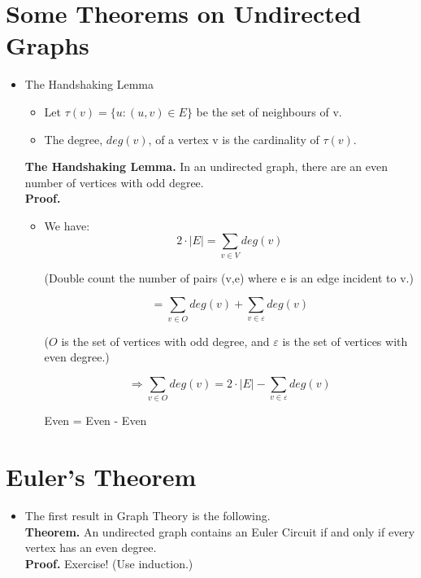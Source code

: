 \documentclass[12pt]{article}
\begin{document}
\section{Some Theorems on Undirected Graphs}
\renewcommand{\labelitemii}{$\circ$}
\renewcommand{\labelitemiii}{$\cdot$}
\renewcommand{\labelitemiii}{$\rightarrow$}
\renewcommand{\labelitemiv}{$\star$}
\begin{itemize}
\item The Handshaking Lemma	
	\begin{itemize}
	\item Let $\tau (v) = \{u: (u,v) \in E\}$ be the set of neighbours of v.
	\item The degree, $deg(v)$, of a vertex v is the cardinality of $\tau (v)$.
	\end{itemize}
\textbf{The Handshaking Lemma.} In an undirected graph, there are an even number of vertices with odd degree.\\
\textbf{Proof.} 
\begin{itemize}
\item We have: \\
	$$2 \cdot |E| = \sum_{v \in V} deg(v)$$
	\begin{center} (Double count the number of pairs (v,e) where e is an edge incident to v.) \end{center}
	$$= \sum_{v \in O} deg(v) + \sum_{v \in \varepsilon} deg(v)$$
	\begin{center} ($O$ is the set of vertices with odd degree, and $\varepsilon$ is the set of vertices with even degree.) \end{center}
	$$ \Rightarrow \sum_{v \in O} deg(v) = 2 \cdot |E| - \sum_{v \in \varepsilon} deg(v)$$
	\begin{center} Even = Even - Even \end{center}
\end{itemize}
\end{itemize}

\section{Euler's Theorem}
\renewcommand{\labelitemii}{$\circ$}
\renewcommand{\labelitemiii}{$\cdot$}
\renewcommand{\labelitemiii}{$\rightarrow$}
\renewcommand{\labelitemiv}{$\star$}
\begin{itemize}
\item The first result in Graph Theory is the following.\\
\textbf{Theorem.} An undirected graph contains an Euler Circuit if and only if every vertex has an even degree.\\
\textbf{Proof.} Exercise! (Use induction.)
\end{itemize}
\end{document}
